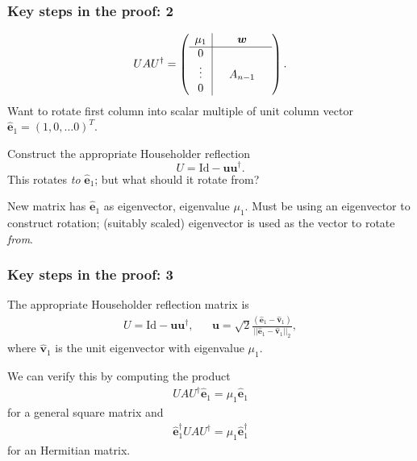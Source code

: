 \documentclass{beamer}
\newcommand{\bfm}[1]{{\boldsymbol{#1}}}
\begin{document}
\begin{frame}
  \frametitle{Key steps in the proof: 2}

  \begin{equation*}
    U A U^{\dagger} = \left(
      \begin{array}{c|c c c}
        \mu_1 & & \bfm{w}& \\ \hline
        0 & &  & \\
        \vdots & & A_{n-1}  & \\
        0 & &  & \\
      \end{array}\right).
  \end{equation*}
  Want to rotate first column into scalar multiple of unit column
  vector $\hat{\bfm{e}}_1 = (1, 0, \dots 0)^T$.

  \vspace{1ex}

  Construct the appropriate Householder reflection
  \begin{equation*}
    U = \text{Id} - \bfm{u}\bfm{u}^{\dagger}.
  \end{equation*}
  This rotates \emph{to} $\hat{\bfm{e}}_1$; but what should it rotate
  from?

  \vspace{1ex}

  New matrix has $\hat{\bfm{e}}_1$ as eigenvector, eigenvalue
  $\mu_1$. Must be using an eigenvector to construct rotation;
  (suitably scaled) eigenvector is used as the vector to rotate
  \emph{from}.

\end{frame}

\begin{frame}
  \frametitle{Key steps in the proof: 3}

  The appropriate Householder reflection matrix is
  \begin{align*}
    U = \text{Id} - \bfm{u}\bfm{u}^{\dagger}, & \mbox{} &
    \bfm{u} = \sqrt{2}\frac{\left( \hat{\bfm{e}}_1-\hat{\bfm{v}}_1 \right)
    }{||\hat{\bfm{e}}_1- \hat{\bfm{v}}_1||_2},
  \end{align*}
  where $\hat{\bfm{v}}_1$ is the unit eigenvector with eigenvalue
  $\mu_1$.\pause

  \vspace{1ex}

  We can verify this by computing the product
  \begin{align*}
    U A U^{\dagger}\hat{\bfm{e}}_1 =  \mu_1 \hat{\bfm{e}}_1
  \end{align*}
  for a general square matrix and
  \begin{align*}
    \hat{\bfm{e}}_1^{\dagger} U A U^{\dagger} = \mu_1 \hat{\bfm{e}}_1^{\dagger}
  \end{align*}
  for an Hermitian matrix.

\end{frame}
\end{document}
